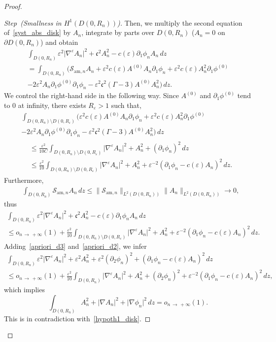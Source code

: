 \documentclass[10pt]{amsart}
\theoremstyle{definition}\newtheorem{defi}[theo]{Definition}\newtheorem{rema}[theo]{Remark}\newtheorem{exam}[theo]{Example}\newtheorem{exem}[theo]{Example}\newtheorem{nota}[theo]{Notation}
\newcommand*\p{\partial}
\newcommand{\amm}{\mathrm{am}}
\newcommand*\BS{\mathcal{S}}
\newcommand*\cs{{\mathfrak c}}
\newcommand*\ii{\infty}
\newcommand*\ls{\leqslant }
\newcommand*\e{\varepsilon}
\newcounter{stepcount}
\newenvironment{step}[1]{\refstepcounter{stepcount}\begin{proof}[{Step~\thestepcount}{\;(#1)}]}{\let\qed\relax\end{proof}}
\begin{document}
\begin{proof}
\begin{step}{{Smallness in $ H^1 (D(0, R_n))$}}
Then, we multiply the second equation of~\eqref{syst_abs_disk} by $ A_n $, integrate by parts over $ D(0,R_n) $ ($A_n =0 $ on $ \p D(0, R_n) $) and obtain
\begin{multline*}
\int_{D(0,R_n)}  \e^2 \lvert \nabla^{\e} A_n \rvert^2 + \cs^2 A_n^2 - c(\e) \p_1 \phi_n A_n \, dz
\\  = \int_{D(0,R_n)} \Big(\BS_{{\amm},n} A_n + \e^2 c(\e) A^{(0)} A_n \p_1 \phi_n + \e^2 c(\e) A_n^2 \p_1 \phi^{(0)}
\\ - 2 \e^2 A_n \p_{1} \phi^{(0)} \p_{1} \phi_n - \e^2 \cs^2 (\Gamma -3) A^{(0)} A_n^2 \Big) \, dz.
\end{multline*}
We control the right-hand side in the following way. Since $ A^{(0)} $ and $ \p_1 \phi^{(0)} $ tend to $0$ at infinity, there exists $ R_\e > 1 $ such that,
\begin{multline*}
 \int_{D(0,R_n) \setminus D(0,R_\e)}
\Big(\e^2 c(\e) A^{(0)} A_n \p_1 \phi_n + \e^2 c(\e) A_n^2 \p_1 \phi^{(0)}
\\ - 2 \e^2 A_n \p_{1} \phi^{(0)} \p_{1} \phi_n - \e^2 \cs^2 (\Gamma -3) A^{(0)} A_n^2 \Big) \, dz
\\
\begin{aligned}
 & \ls
\frac{\e^2}{10 C } \int_{D(0,R_n) \setminus D(0,R_\e)} \lvert \nabla^{\e} A_n \rvert^2 + A_n^2 + (\p_1 \phi_n)^2 \, dz
\\ & \ls
\frac{\e^2}{10} \int_{D(0,R_n) \setminus D(0,R_\e)} \lvert \nabla^{\e} A_n \rvert^2 + A_n^2 + \e^{-2} (\p_1 \phi_n - c (\e) A_n)^2 \, dz.
\end{aligned}
\end{multline*}
Furthermore,
\begin{align*}
& \int_{D(0,R_n) } \BS_{{\amm},n} A_n \, dz
\ls \| \BS_{{\amm},n} \|_{L^2(D(0,R_n))} \| A_n \|_{L^2(D(0,R_n))}
\to 0,
\end{align*}
thus
\begin{multline}\label{apriori_d3}
\int_{D(0,R_n)} \e^2 \lvert \nabla^{\e} A_n \rvert^2 + \cs^2 A_n^2 - c(\e) \p_1 \phi_n A_n \, dz \\
\ls o_{n\, \to\,+\ii} (1) + \frac{\e^2}{10} \int_{D(0,R_n) \setminus D(0,R_\e)} \lvert \nabla^{\e} A_n \rvert^2 + A_n^2 + \e^{-2} (\p_1 \phi_n - c (\e) A_n)^2 \, dz.
\end{multline}
Adding~\eqref{apriori_d3} and~\eqref{apriori_d2}, we infer
\begin{multline*}
\int_{D(0,R_n)} \e^2 \lvert \nabla^{\e} A_n \rvert^2 + \e^2 A_n^2 + \e^2 (\p_2 \phi_n)^2 + (\p_1 \phi_n - c(\e) A_n)^2 \, dz
\\  \ls o_{n\, \to\,+\ii} (1) + \frac{\e^2}{10} \int_{D(0,R_n)} \lvert \nabla^{\e} A_n \rvert^2 + A_n^2 + (\p_2 \phi_n)^2 + \e^{-2} (\p_1 \phi_n - c(\e) A_n)^2 \, dz,
\end{multline*}
which implies
\begin{equation}\label{apriori_d5}
\int_{D(0,R_n)} A_n^2 + \lvert \nabla A_n \rvert^2 + \lvert \nabla \phi_n \rvert^2
\, dz = o_{n\,\to\,+\ii} (1).
\end{equation}
This is in contradiction with~\eqref{hypoth1_disk}.\qedhere
\end{step}\let\qed\relax
\end{proof}
\end{document}
